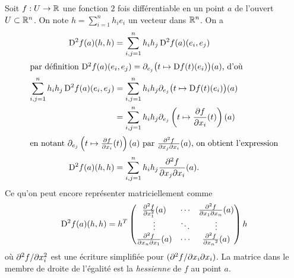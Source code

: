 \documentclass[11pt, a4paper]{article}
\begin{document}
Soit $f : U \to \mathbb{R}$ une fonction $2$ fois différentiable en un point
$a$ de l'ouvert $U \subset \mathbb{R}^n$. On note $h = \sum_{i=1}^n h_ie_i$ un
vecteur dans $\mathbb{R}^n$. On a
\begin{align*}
  \operatorname{D\!}{^2f}(a)(h, h) & = \sum_{i, j = 1}^n h_ih_j\operatorname{D\!}{^2f}(a)(e_i, e_j) \\
  \intertext{par définition $\operatorname{D\!}{^2 f}(a)(e_i, e_j) = \partial_{e_j}\big(t \mapsto \operatorname{D\!}{f}(t)(e_i)\big)(a)$, d'où} 
  \sum_{i, j = 1}^n h_ih_j\operatorname{D\!}{^2f}(a)(e_i, e_j)  & = \sum_{i, j = 1}^n h_ih_j \partial_{e_j}\big(t \mapsto \operatorname{D\!}{f}(t)(e_i)\big)(a) \\
                    & = \sum_{i, j = 1}^n h_ih_j \partial_{e_j}\left( t \mapsto \frac{\partial{f}}{\partial{x_i}}(t)\right)(a) \\
  \intertext{en notant $\partial_{e_j}\left( t \mapsto \frac{\partial{f}}{\partial{x_i}}(t)\right)(a)$ 
             par $\frac{\partial^2{f}}{\partial{x_j}\partial{x_i}}(a)$, on obtient l'expression}  
  \operatorname{D\!}{^2f}(a)(h, h) & = \sum_{i, j = 1}^n h_ih_j \frac{\partial^2{f}}{\partial{x_j}\partial{x_i}}(a).
\end{align*}
Ce qu'on peut encore représenter matriciellement comme
\[
\operatorname{D\!}{^2f}(a)(h, h) = h^T
\begin{pmatrix}
\frac{\partial^2{f}}{\partial{x_1^2}}(a) & \cdots & \frac{\partial^2{f}}{\partial{x_1}\partial{x_n}}(a) \\
\vdots & \ddots & \vdots  \\
\frac{\partial^2{f}}{\partial{x_n}\partial{x_1}}(a) & \cdots & \frac{\partial^2{f}}{\partial{x_n}^2}(a)  
\end{pmatrix}
h
\]
où $\partial^2{f}/\partial{x_i^2}$ est une écriture simplifiée pour
$(\partial^2{f}/\partial{x_i}\partial{x_i})$. La matrice dans le membre de droite de
l'égalité est la \emph{hessienne} de $f$ au point $a$.
\end{document}
